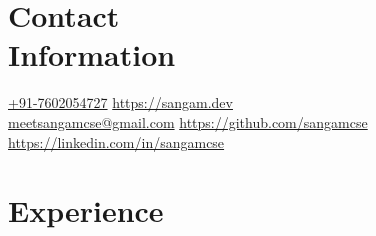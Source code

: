 \documentclass[margin,line]{resume}
\begin{document}
\begin{resume}
    \section{\mysidestyle Contact\\Information}
    \href{tel:+917602054727}{+91-7602054727}                                      \hfill    \url{https://sangam.dev}\\%
    \href{mailto:meetsangamcse@gmail.com}{meetsangamcse@gmail.com}      \hfill    \url{https://github.com/sangamcse}\\%
    \null                                                            \hfill    \url{https://linkedin.com/in/sangamcse}%

    \section{\mysidestyle Experience}


\end{resume}
\end{document}
